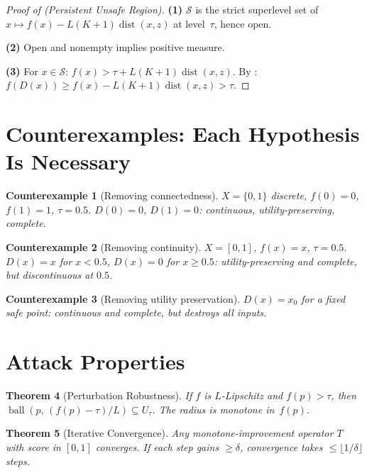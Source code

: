 \documentclass[11pt]{article}
\newtheorem{theorem}{Theorem}[section]
\newtheorem{counterexample}[theorem]{Counterexample}
\newcommand{\dist}{\operatorname{dist}}
\begin{document}
\begin{proof}[Proof of  (Persistent Unsafe Region)]
\textbf{(1)} $\mathcal{S}$ is the strict superlevel set of
$x \mapsto f(x) - L(K{+}1)\dist(x,z)$ at level~$\tau$, hence open.

\textbf{(2)} Open and nonempty implies positive measure.

\textbf{(3)} For $x \in \mathcal{S}$:
$f(x) > \tau + L(K{+}1)\dist(x,z)$. By :
$f(D(x)) \geq f(x) - L(K{+}1)\dist(x,z) > \tau$.
\end{proof}


\section{Counterexamples: Each Hypothesis Is Necessary}
\label{app:counterexamples}

\begin{counterexample}[Removing connectedness]
$X = \{0,1\}$ discrete, $f(0)=0$, $f(1)=1$, $\tau=0.5$.
$D(0)=0$, $D(1)=0$: continuous, utility-preserving, complete.
\end{counterexample}

\begin{counterexample}[Removing continuity]
$X=[0,1]$, $f(x)=x$, $\tau=0.5$. $D(x)=x$ for $x<0.5$,
$D(x)=0$ for $x \geq 0.5$: utility-preserving and complete,
but discontinuous at $0.5$.
\end{counterexample}

\begin{counterexample}[Removing utility preservation]
$D(x) = x_0$ for a fixed safe point: continuous and complete,
but destroys all inputs.
\end{counterexample}


\section{Attack Properties}
\label{app:attacks}

\begin{theorem}[Perturbation Robustness]
\label{thm:lipschitz}
If $f$ is $L$-Lipschitz and $f(p)>\tau$, then
$\operatorname{ball}(p,\, (f(p)-\tau)/L) \subseteq U_\tau$.
The radius is monotone in~$f(p)$.
\end{theorem}

\begin{theorem}[Iterative Convergence]
\label{thm:convergence}
Any monotone-improvement operator $T$ with score in $[0,1]$ converges.
If each step gains $\geq \delta$, convergence takes
$\leq \lfloor 1/\delta \rfloor$ steps.
\end{theorem}
\end{document}
